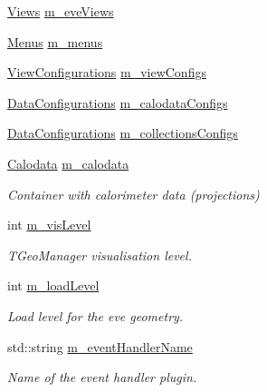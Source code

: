 \begin{DoxyCompactItemize}
\item 
\hyperlink{class_d_d4hep_1_1_display_a93fcdf6ec0390291e26d59d0d78cd6e8}{Views} \hyperlink{class_d_d4hep_1_1_display_a5cbd62240a063355076bc617b80a7120}{m\+\_\+eve\+Views}
\item 
\hyperlink{class_d_d4hep_1_1_display_a4dbc259bd581b56802ef3c29b72909be}{Menus} \hyperlink{class_d_d4hep_1_1_display_aa6b6e111d83802be4a9a39024cfda066}{m\+\_\+menus}
\item 
\hyperlink{class_d_d4hep_1_1_display_a1bb7fbc1eeb22ef2b1cea35c78e9d27a}{View\+Configurations} \hyperlink{class_d_d4hep_1_1_display_aaa73b23932af6bf1d1f1e37d621e564c}{m\+\_\+view\+Configs}
\item 
\hyperlink{class_d_d4hep_1_1_display_a730a4516989abe8b2f788c8f957e0633}{Data\+Configurations} \hyperlink{class_d_d4hep_1_1_display_a6b3fd66eb5ee434f3cf10b2934cb71a3}{m\+\_\+calodata\+Configs}
\item 
\hyperlink{class_d_d4hep_1_1_display_a730a4516989abe8b2f788c8f957e0633}{Data\+Configurations} \hyperlink{class_d_d4hep_1_1_display_af1a17085548605e16470dc43e017d209}{m\+\_\+collections\+Configs}
\item 
\hyperlink{class_d_d4hep_1_1_display_a692339ace65797a205d2332c4a652598}{Calodata} \hyperlink{class_d_d4hep_1_1_display_a5f32c54601dd6e6a8556e6ffbafb10cc}{m\+\_\+calodata}
\begin{DoxyCompactList}\small\item\em Container with calorimeter data (projections) \end{DoxyCompactList}\item 
int \hyperlink{class_d_d4hep_1_1_display_a1e2bb859df3df7dc1bbc6447094e8f66}{m\+\_\+vis\+Level}
\begin{DoxyCompactList}\small\item\em T\+Geo\+Manager visualisation level. \end{DoxyCompactList}\item 
int \hyperlink{class_d_d4hep_1_1_display_a82e390dcf9124ff53abd433e9b0bcef5}{m\+\_\+load\+Level}
\begin{DoxyCompactList}\small\item\em Load level for the eve geometry. \end{DoxyCompactList}\item 
std\+::string \hyperlink{class_d_d4hep_1_1_display_a0a6d204fcf140071018ef6cb3040c19b}{m\+\_\+event\+Handler\+Name}
\begin{DoxyCompactList}\small\item\em Name of the event handler plugin. \end{DoxyCompactList}\end{DoxyCompactItemize}


